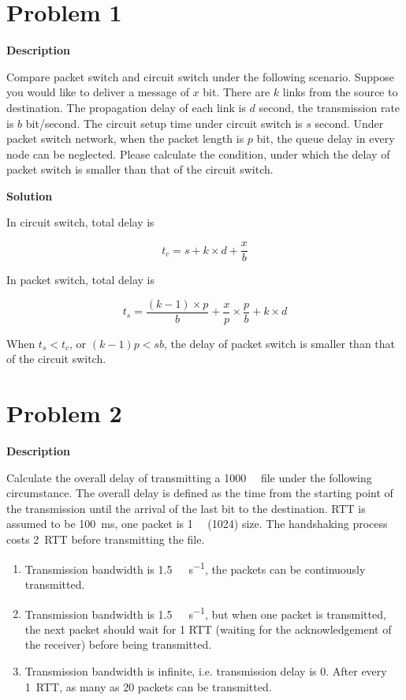 \documentclass[12pt,letterpaper]{ctexart}
\begin{document}
\section*{Problem 1}

{\bf Description}

Compare packet switch and circuit switch under the following scenario.
Suppose you would like to deliver a message of $x$ bit.
There are $k$ links from the source to destination.
The propagation delay of each link is $d$ second, the transmission rate is $b$ bit/second.
The circuit setup time under circuit switch is $s$ second.
Under packet switch network, when the packet length is $p$ bit, the queue delay in every node can be neglected.
Please calculate the condition, under which the delay of packet switch is smaller than that of the circuit switch.

{\bf Solution}

  In circuit switch, total delay is

  $$
  t_{c} = s + k \times d + \frac{x}{b}
  $$

  In packet switch, total delay is

  $$
  t_{s} = \frac{(k - 1) \times p }{b} + \frac{x}{p} \times \frac{p}{b} + k \times  d
  $$

  When $t_s < t_c$, or $ (k - 1) p < sb$, the delay of packet switch is smaller than that of the circuit switch.

\newpage

\section*{Problem 2}

{\bf Description}

Calculate the overall delay of transmitting a \SI{1000}{\kilo\byte} file under the following circumstance.
The overall delay is defined as the time from the starting point of the transmission until the arrival of the last bit to the destination.
RTT is assumed to be \SI{100}{\ms}, one packet is \SI{1}{\kilo\byte} (\SI{1024}{\byte}) size.
The handshaking process costs \SI{2}{RTT} before transmitting the file.
\begin{enumerate}
  \item Transmission bandwidth is \SI[per-mode=symbol]{1.5}{\mega\byte\per\second}, the packets can be continuously transmitted.
  \item Transmission bandwidth is \SI[per-mode=symbol]{1.5}{\mega\byte\per\second}, but when one packet is transmitted, the next packet should wait for 1 RTT (waiting for the acknowledgement of the receiver) before being transmitted.
  \item Transmission bandwidth is infinite, i.e. transmission delay is 0. After every \SI{1}{RTT}, as many as 20 packets can be transmitted.
\end{enumerate}
\end{document}
